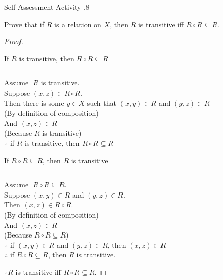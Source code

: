 \documentclass[\main/notes.tex]{subfiles}
\begin{document}
\begin{exercise}{Self Assessment Activity \thechapter.8}
\begin{questions}
\begin{enumerate}
							\end{enumerate}
						\item Prove that if $R$ is a relation on $X$, then $R$ is transitive iff $R \circ R \subseteq R$.
							\begin{answer}
								\begin{proof}
									$ $
									\begin{questions}[label=(\roman*)]
										\item If $R$ is transitive, then $R \circ R \subseteq R$
											\begin{answer}
												\begin{subproof}[Subproof]
													$ $
													\begin{tabbing}
														Assume \qquad \= $R$ is transitive.\\
														Suppose \> $(x, z) \in R \circ R$.\\
														Then \> there is some $y \in X$ such that $(x, y) \in R$ and $(y, z) \in R$\\
														\> (By definition of composition)\\
														And \> $(x, z) \in R$\\
														\> (Because $R$ is transitive)\\
														$\therefore$ \> if $R$ is transitive, then $R \circ R \subseteq R$
													\end{tabbing}
												\end{subproof}
											\end{answer}
										\pagebreak
										\item If $R \circ R \subseteq R$, then $R$ is transitive
											\begin{answer}
												\begin{subproof}[Subproof]
													$ $
													\begin{tabbing}
														Assume \qquad \= $R \circ R \subseteq R$.\\
														Suppose \> $(x, y) \in R$ and $(y, z) \in R$.\\
														Then \> $(x, z) \in R \circ R$.\\
														\> (By definition of composition)\\
														And \> $(x, z) \in R$\\
														\> (Because $R \circ R \subseteq R$)\\
														$\therefore$ \> if $(x, y) \in R$ and $(y, z) \in R$, then $(x, z) \in R$\\
														$\therefore$ \> if $R \circ R \subseteq R$, then $R$ is transitive.
													\end{tabbing}
												\end{subproof}
											\end{answer}
									\end{questions}
									$\therefore R$ is transitive iff $R \circ R \subseteq R$.
								\end{proof}
							\end{answer}
					\end{questions}
				\end{exercise}
\end{document}
